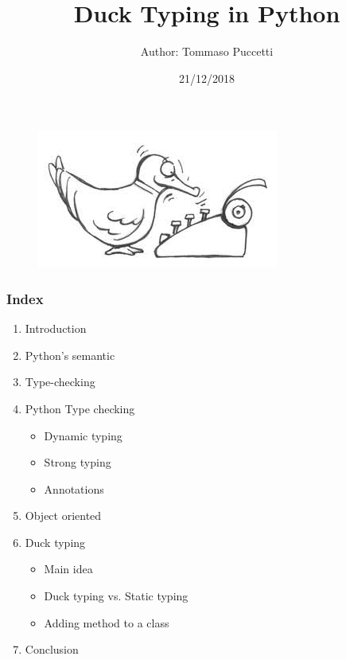 \documentclass[xcolor ={table,usenames,dvipsnames}]{beamer}
\title{Duck Typing in Python}
\author{Author: Tommaso Puccetti}
\institute{Universit\`a  degli Studi di Firenze}
\date{21/12/2018}
\theoremstyle{definition}
\begin{document}
	
	\begin{frame}
		\maketitle
			\begin{figure}[h!]
			\centering
			\includegraphics[scale=2]{img/cartoonduck.jpg}
			\label{Interfacce di un CS}
		\end{figure}
	\end{frame}

	\begin{frame}
		\frametitle{Index}
		\begin{enumerate}
			\item Introduction
			\item Python's semantic
			\item Type-checking
			\item Python Type checking
			 \begin{itemize}
					\item Dynamic typing
					\item Strong typing
					\item Annotations
				  \end{itemize}
			\item Object oriented
			\item Duck typing
				  \begin{itemize}
				  	\item Main idea
				  	\item Duck typing vs. Static typing
				  	\item Adding method to a class
				  \end{itemize}
			\item Conclusion
		\end{enumerate}
	\end{frame}
\end{document}
